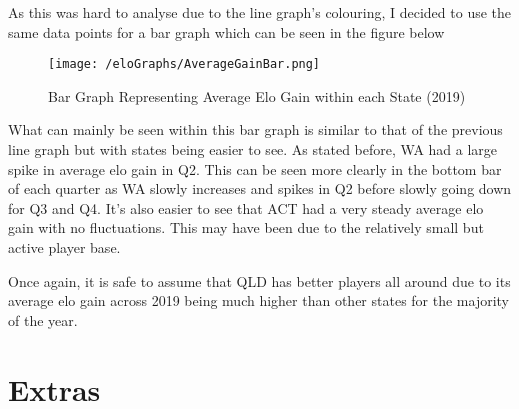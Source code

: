\documentclass[11pt, oneside, a4paper]{article}
\begin{document}
As this was hard to analyse due to the line graph's colouring, I decided to use the same data points for a bar graph which can be seen in the figure below

\newpage
\begin{figure}[!ht]
	\centerline{\texttt{[image: /eloGraphs/AverageGainBar.png]}}
	\caption{Bar Graph Representing Average Elo Gain within each State  (2019)}
	\label{fig:figure2}
\end{figure}

What can mainly be seen within this bar graph is similar to that of the previous line graph but with states being easier to see. As stated before, WA had a large spike in average elo gain in Q2. This can be seen more clearly in the bottom bar of each quarter as WA slowly increases and spikes in Q2 before slowly going down for Q3 and Q4. It's also easier to see that ACT had a very steady average elo gain with no fluctuations. This may have been due to the relatively small but active player base. 

Once again, it is safe to assume that QLD has better players all around due to its average elo gain across 2019 being much higher than other states for the majority of the year.



\newpage
\section{Extras}
\end{document}
